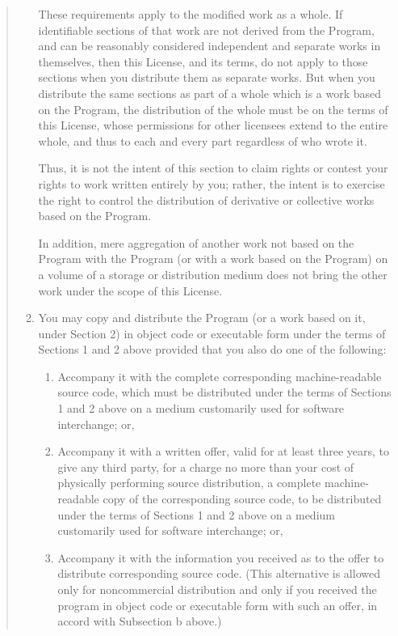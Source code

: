 \documentclass[twoside,11pt]{article}
\renewcommand{\_}{\texttt{\symbol{95}}}
\begin{document}
\begin{quote}
\begin{enumerate}
These requirements apply to the modified work as a whole.  If
identifiable sections of that work are not derived from the Program,
and can be reasonably considered independent and separate works in
themselves, then this License, and its terms, do not apply to those
sections when you distribute them as separate works.  But when you
distribute the same sections as part of a whole which is a work based
on the Program, the distribution of the whole must be on the terms of
this License, whose permissions for other licensees extend to the
entire whole, and thus to each and every part regardless of who wrote it.

Thus, it is not the intent of this section to claim rights or contest
your rights to work written entirely by you; rather, the intent is to
exercise the right to control the distribution of derivative or
collective works based on the Program.

In addition, mere aggregation of another work not based on the Program
with the Program (or with a work based on the Program) on a volume of
a storage or distribution medium does not bring the other work under
the scope of this License.

\item
You may copy and distribute the Program (or a work based on it,
under Section 2) in object code or executable form under the terms of
Sections 1 and 2 above provided that you also do one of the following:

\begin{enumerate}

\item

Accompany it with the complete corresponding machine-readable
source code, which must be distributed under the terms of Sections
1 and 2 above on a medium customarily used for software interchange; or,

\item

Accompany it with a written offer, valid for at least three
years, to give any third party, for a charge no more than your
cost of physically performing source distribution, a complete
machine-readable copy of the corresponding source code, to be
distributed under the terms of Sections 1 and 2 above on a medium
customarily used for software interchange; or,

\item

Accompany it with the information you received as to the offer
to distribute corresponding source code.  (This alternative is
allowed only for noncommercial distribution and only if you
received the program in object code or executable form with such
an offer, in accord with Subsection b above.)


\end{enumerate}
\end{enumerate}
\end{quote}
\end{document}
